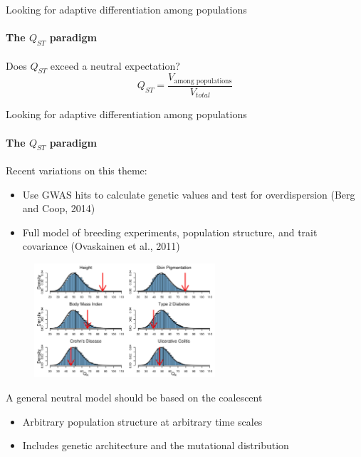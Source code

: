 \documentclass{beamer}
\begin{document}
\begin{frame}{Looking for adaptive differentiation among populations}
  \framesubtitle{The $Q_{ST}$ paradigm}
  \begin{block}{Does $Q_{ST}$ exceed a neutral expectation?}
    \begin{equation*}
    Q_{ST} = \frac{V_{\mbox{among populations}}}{V_{total}}
    \end{equation*}
  \end{block}
\end{frame}

\begin{frame}{Looking for adaptive differentiation among populations}
  \framesubtitle{The $Q_{ST}$ paradigm}
  Recent variations on this theme:
  \begin{itemize}
  \item Use GWAS hits to calculate genetic values and test for overdispersion
    (Berg and Coop, 2014)
  \item Full model of breeding experiments, population structure, and trait
    covariance (Ovaskainen et al., 2011)
  \end{itemize}
  \begin{figure}
    \includegraphics[width=0.6\textwidth]{berg_coop.png}
  \end{figure}
\end{frame}

\begin{frame}{A general neutral model should be based on the coalescent}
  \begin{itemize}
  \item Arbitrary population structure at arbitrary time scales
  \item Includes genetic architecture and the mutational distribution
  \end{itemize}
\end{frame}
\end{document}
